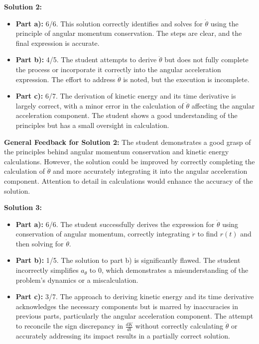 \documentclass[a4paper,11pt]{article}
\begin{document}
\hrulefill

\textbf{Solution 2:}

\begin{itemize}
    \item \textbf{Part a):} 6/6. This solution correctly identifies and solves for \(\dot{\theta}\) using the principle of angular momentum conservation. The steps are clear, and the final expression is accurate.
    
    \item \textbf{Part b):} 4/5. The student attempts to derive \(\ddot{\theta}\) but does not fully complete the process or incorporate it correctly into the angular acceleration expression. The effort to address \(\ddot{\theta}\) is noted, but the execution is incomplete.
    
    \item \textbf{Part c):} 6/7. The derivation of kinetic energy and its time derivative is largely correct, with a minor error in the calculation of \(\ddot{\theta}\) affecting the angular acceleration component. The student shows a good understanding of the principles but has a small oversight in calculation.
\end{itemize}

\textbf{General Feedback for Solution 2:} The student demonstrates a good grasp of the principles behind angular momentum conservation and kinetic energy calculations. However, the solution could be improved by correctly completing the calculation of \(\ddot{\theta}\) and more accurately integrating it into the angular acceleration component. Attention to detail in calculations would enhance the accuracy of the solution.

\hrulefill

\textbf{Solution 3:}

\begin{itemize}
    \item \textbf{Part a):} 6/6. The student successfully derives the expression for \(\dot{\theta}\) using conservation of angular momentum, correctly integrating \(\dot{r}\) to find \(r(t)\) and then solving for \(\dot{\theta}\).
    
    \item \textbf{Part b):} 1/5. The solution to part b) is significantly flawed. The student incorrectly simplifies \(a_{\theta}\) to \(0\), which demonstrates a misunderstanding of the problem's dynamics or a miscalculation.
    
    \item \textbf{Part c):} 3/7. The approach to deriving kinetic energy and its time derivative acknowledges the necessary components but is marred by inaccuracies in previous parts, particularly the angular acceleration component. The attempt to reconcile the sign discrepancy in \(\frac{dK}{dt}\) without correctly calculating \(\ddot{\theta}\) or accurately addressing its impact results in a partially correct solution.
\end{itemize}
\end{document}
